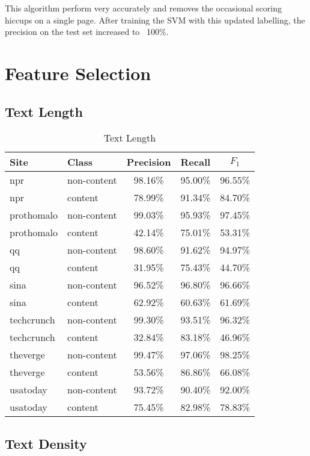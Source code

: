 \documentclass{acm_proc_article-sp}
\begin{document}
This algorithm perform very accurately and removes the occasional scoring hiccups on a single page. After training the SVM with this updated labelling, the precision on the test set increased to ~100\%.

\section{Feature Selection}
\label{sec:feature}
\subsection{Text Length}

\begin{table}
\centering
\caption{Text Length}
\begin{tabular}{|l|l|c|c|c|} \hline
Site&Class&Precision&Recall&$F_1$\\ \hline
npr&non-content&98.16\%&95.00\%&96.55\%\\ \hline
npr&content&78.99\%&91.34\%&84.70\%\\ \hline
prothomalo&non-content&99.03\%&95.93\%&97.45\%\\ \hline
prothomalo&content&42.14\%&75.01\%&53.31\%\\ \hline
qq&non-content&98.60\%&91.62\%&94.97\%\\ \hline
qq&content&31.95\%&75.43\%&44.70\%\\ \hline
sina&non-content&96.52\%&96.80\%&96.66\%\\ \hline
sina&content&62.92\%&60.63\%&61.69\%\\ \hline
techcrunch&non-content&99.30\%&93.51\%&96.32\%\\ \hline
techcrunch&content&32.84\%&83.18\%&46.96\%\\ \hline
theverge&non-content&99.47\%&97.06\%&98.25\%\\ \hline
theverge&content&53.56\%&86.86\%&66.08\%\\ \hline
usatoday&non-content&93.72\%&90.40\%&92.00\%\\ \hline
usatoday&content&75.45\%&82.98\%&78.83\%\\ \hline
\end{tabular}
\end{table}


\subsection{Text Density}
\end{document}
